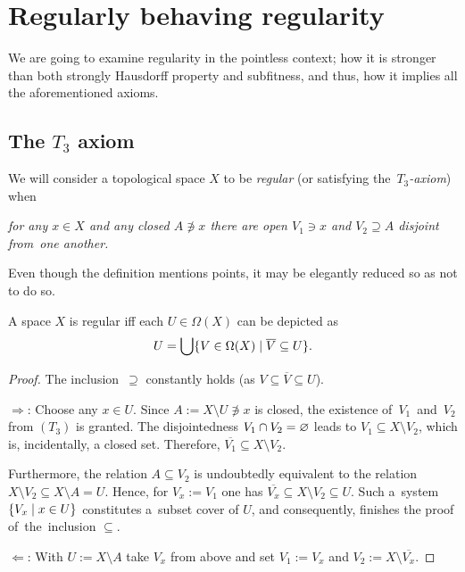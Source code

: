 \chapter{Regularly behaving regularity}

We are going to examine regularity in the pointless context;
how it is stronger than both strongly Hausdorff property and subfitness, and
thus, how it implies all the aforementioned axioms.

\section{The $T_3$ axiom}

\begin{framed}
  \begin{df}[$T_3$]
    We will consider a topological space $X$ to be \emph{regular\/} (or
    satisfying the~\emph{$T_3$-axiom\/}) when
    \begin{center} \it
      for any $x\in X$ and any closed $A \not\owns x$ there are open $V_1\owns
      x$ and $V_2\supseteq A$ disjoint from~one another.
    \end{center}
  \end{df}
\end{framed}

Even though the definition mentions points, it may be elegantly reduced so as
not to do so.

\begin{prop}
  A space $X$ is regular iff each $U\in \Omega(X)$ can be depicted as
  \[
    U = \bigcup \{V\in \Omega(X) \mid \overline{V} \subseteq U\}.
  \]
\end{prop}
\begin{proof}
  The inclusion~$\supseteq$ constantly holds (as $V\subseteq
  \overline{V}\subseteq U$).

  $\Rightarrow$:
  Choose any $x\in U$.
  Since $A := X\setminus U \not\owns x$ is closed, the existence
  of~$V_1$~and~$V_2$ from $(T_3)$ is granted.
  The disjointedness $V_1 \cap V_2 = \varnothing$ leads to $V_1\subseteq X\setminus
  V_2$, which is, incidentally, a closed set.
  Therefore, $\overline{V_1}\subseteq X\setminus V_2$.

  Furthermore, the relation $A\subseteq V_2$ is undoubtedly equivalent to the
  relation $X\setminus V_2\subseteq X \setminus A = U$.
  Hence, for $V_x := V_1$ one has $\overline{V_x}\subseteq X\setminus V_2\subseteq
  U$.
  Such a~system $\{V_x \mid x\in U\}$ constitutes a~subset cover of $U$, and
  consequently, finishes the proof of~the~inclusion $\subseteq$.

  $\Leftarrow$:
  With $U := X\setminus A$ take $V_x$ from above and set $V_1 := V_x$ and $V_2
  := X\setminus \overline{V_x}$.
\end{proof}
